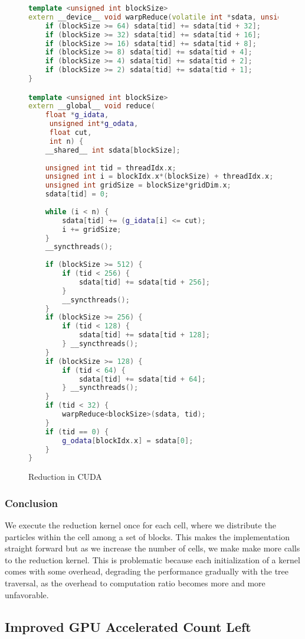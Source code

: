 \documentclass[]{article}
\begin{document}
\begin{figure}[H]
	\begin{lstlisting}[language=c++]
template <unsigned int blockSize>
extern __device__ void warpReduce(volatile int *sdata, unsigned int tid) {
	if (blockSize >= 64) sdata[tid] += sdata[tid + 32];
	if (blockSize >= 32) sdata[tid] += sdata[tid + 16];
	if (blockSize >= 16) sdata[tid] += sdata[tid + 8];
	if (blockSize >= 8) sdata[tid] += sdata[tid + 4];
	if (blockSize >= 4) sdata[tid] += sdata[tid + 2];
	if (blockSize >= 2) sdata[tid] += sdata[tid + 1];
}

template <unsigned int blockSize>
extern __global__ void reduce(
	float *g_idata,
	 unsigned int*g_odata, 
	 float cut, 
	 int n) {
	__shared__ int sdata[blockSize];
	
	unsigned int tid = threadIdx.x;
	unsigned int i = blockIdx.x*(blockSize) + threadIdx.x;
	unsigned int gridSize = blockSize*gridDim.x;
	sdata[tid] = 0;
	
	while (i < n) {
		sdata[tid] += (g_idata[i] <= cut);
		i += gridSize;
	}
	__syncthreads();
	
	if (blockSize >= 512) {
		if (tid < 256) {
			sdata[tid] += sdata[tid + 256];
		}
		__syncthreads();
	}
	if (blockSize >= 256) {
		if (tid < 128) {
			sdata[tid] += sdata[tid + 128];
		} __syncthreads();
	}
	if (blockSize >= 128) {
		if (tid < 64) {
			sdata[tid] += sdata[tid + 64];
		} __syncthreads();
	}
	if (tid < 32) {
		warpReduce<blockSize>(sdata, tid);
	}
	if (tid == 0) {
		g_odata[blockIdx.x] = sdata[0];
	}
}
	\end{lstlisting}
	\caption{Reduction in CUDA}
	\label{cuda:reduction}
\end{figure}

\subsubsection{Conclusion}

We execute the reduction kernel once for each cell, where we distribute the particles within the cell among a set of blocks. This makes the implementation straight forward but as we increase the number of cells, we make make more calls to the reduction kernel. This is problematic because each initialization of a kernel comes with some overhead, degrading the performance gradually with the tree traversal, as the overhead to computation ratio becomes more and more unfavorable.  



\subsection{Improved GPU Accelerated Count Left}
\end{document}

